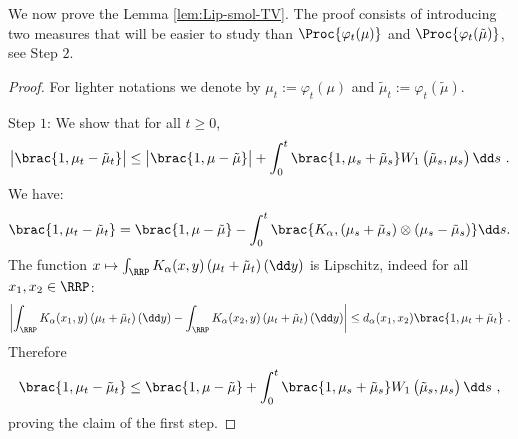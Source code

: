 We now prove the Lemma \ref{lem:Lip-smol-TV}. The proof consists of introducing two measures that will be easier to study than $\Proc{\varphi_t(\mu)}$ and $\Proc{\varphi_t(\tilde{\mu})}$, see Step $2$.
\begin{proof}
    For lighter notations we denote by $\mu_t := \varphi_t(\mu)$ and $\tilde{\mu}_t := \varphi_t(\tilde{\mu})$.
    
    Step $1$: We show that for all $t \geq 0$, 
    \begin{align*}
        \left| \vphantom{A^2}\brac{1,\mu_t - \tilde{\mu}_t} \right| \leq \left| \vphantom{A^2}\brac{1,\mu - \tilde{\mu}} \right| + \int_0^t \brac{1,\mu_s + \tilde{\mu}_s}W_1\left(\vphantom{A^2}\tilde{\mu}_s,\mu_s\right) \dd s\ .
    \end{align*}
    We have:
    \begin{align*}
        \brac{1,\mu_t - \tilde{\mu}_t} = \brac{1,\mu - \tilde{\mu}} - \int_0^t \brac{K_\alpha,\left(\mu_s + \tilde{\mu}_s\right)\otimes \left(\mu_s - \tilde{\mu}_s\right)}\dd s.
    \end{align*}
    The function $x \mapsto \int_{\RRP} K_\alpha(x,y)\left(\mu_t + \tilde{\mu}_t\right)(\dd y)$ is Lipschitz, indeed for all $x_1,x_2 \in \RRP$:
    \begin{align*}
        \left|\int_{\RRP} K_\alpha(x_1,y)\left(\mu_t + \tilde{\mu}_t\right)(\dd y) - \int_{\RRP} K_\alpha(x_2,y)\left(\mu_t + \tilde{\mu}_t\right)(\dd y)\right| \leq d_\alpha(x_1,x_2) \brac{1,\mu_t + \tilde{\mu}_t}\ .
    \end{align*}
    Therefore
    \begin{align*}
        \brac{1,\mu_t - \tilde{\mu}_t} \leq \brac{1,\mu - \tilde{\mu}} + \int_0^t \brac{1,\mu_s + \tilde{\mu}_s}W_1\left(\vphantom{A^2}\tilde{\mu}_s,\mu_s\right) \dd s\ ,
    \end{align*}
    proving the claim of the first step.


\end{proof}
